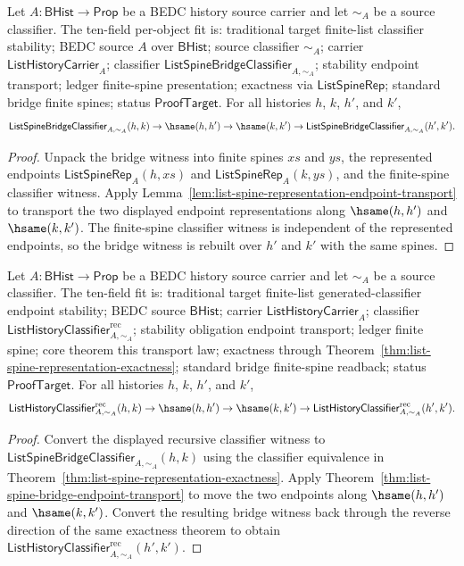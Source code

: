 \begin{theorem}
\label{thm:list-spine-bridge-endpoint-transport}
Let $A:\mathsf{BHist}\to\mathsf{Prop}$ be a BEDC history source carrier and let
$\sim_A$ be a source classifier. The ten-field per-object fit is: traditional
target finite-list classifier stability; BEDC source $A$ over $\mathsf{BHist}$;
source classifier $\sim_A$; carrier $\mathsf{ListHistoryCarrier}_A$; classifier
$\mathsf{ListSpineBridgeClassifier}_{A,\sim_A}$; stability endpoint transport;
ledger finite-spine presentation; exactness via $\mathsf{ListSpineRep}$; standard
bridge finite spines; status $\mathsf{ProofTarget}$. For all histories $h$, $k$,
$h'$, and $k'$,
$$
\mathsf{ListSpineBridgeClassifier}_{A,\sim_A}(h,k)
\to
\hsame(h,h')
\to
\hsame(k,k')
\to
\mathsf{ListSpineBridgeClassifier}_{A,\sim_A}(h',k').
$$
\end{theorem}
\begin{proof}
Unpack the bridge witness into finite spines $xs$ and $ys$, the represented
endpoints $\mathsf{ListSpineRep}_A(h,xs)$ and
$\mathsf{ListSpineRep}_A(k,ys)$, and the finite-spine classifier witness. Apply
Lemma~\ref{lem:list-spine-representation-endpoint-transport} to transport the
two displayed endpoint representations along $\hsame(h,h')$ and $\hsame(k,k')$.
The finite-spine classifier witness is independent of the represented endpoints,
so the bridge witness is rebuilt over $h'$ and $k'$ with the same spines.
\end{proof}

\begin{theorem}
\label{thm:list-recursive-history-classifier-endpoint-transport}
Let $A:\mathsf{BHist}\to\mathsf{Prop}$ be a BEDC history source carrier and let
$\sim_A$ be a source classifier. The ten-field fit is: traditional target
finite-list generated-classifier endpoint stability; BEDC source
$\mathsf{BHist}$; carrier $\mathsf{ListHistoryCarrier}_A$; classifier
$\mathsf{ListHistoryClassifier}^{\mathrm{rec}}_{A,\sim_A}$; stability obligation
endpoint transport; ledger finite spine; core theorem this transport law;
exactness through Theorem~\ref{thm:list-spine-representation-exactness};
standard bridge finite-spine readback; status $\mathsf{ProofTarget}$. For all
histories $h$, $k$, $h'$, and $k'$,
$$
\mathsf{ListHistoryClassifier}^{\mathrm{rec}}_{A,\sim_A}(h,k)
\to
\hsame(h,h')
\to
\hsame(k,k')
\to
\mathsf{ListHistoryClassifier}^{\mathrm{rec}}_{A,\sim_A}(h',k').
$$
\end{theorem}
\begin{proof}
Convert the displayed recursive classifier witness to
$\mathsf{ListSpineBridgeClassifier}_{A,\sim_A}(h,k)$ using the classifier
equivalence in Theorem~\ref{thm:list-spine-representation-exactness}. Apply
Theorem~\ref{thm:list-spine-bridge-endpoint-transport} to move the two
endpoints along $\hsame(h,h')$ and $\hsame(k,k')$. Convert the resulting bridge
witness back through the reverse direction of the same exactness theorem to
obtain $\mathsf{ListHistoryClassifier}^{\mathrm{rec}}_{A,\sim_A}(h',k')$.
\end{proof}

